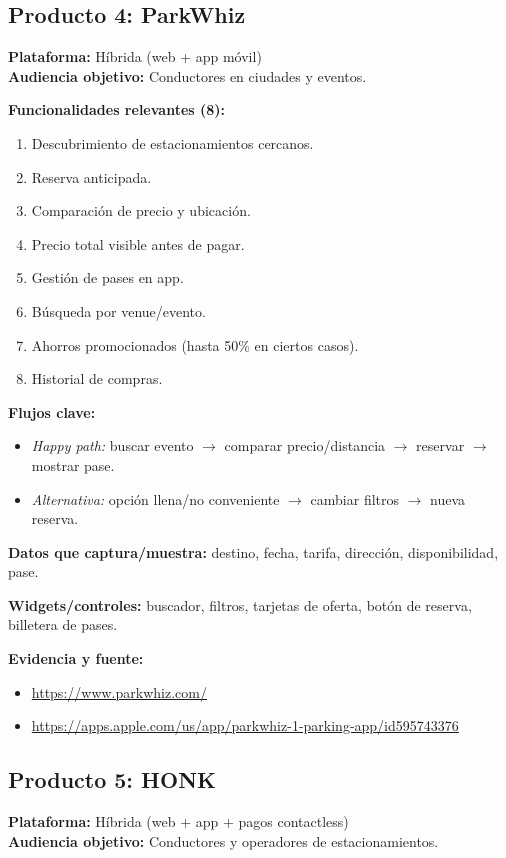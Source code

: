 \documentclass[11pt]{article}
\begin{document}
\subsection{Producto 4: ParkWhiz}
\textbf{Plataforma:} Híbrida (web + app móvil)\\
\textbf{Audiencia objetivo:} Conductores en ciudades y eventos.

\textbf{Funcionalidades relevantes (8):}
\begin{enumerate}
\item Descubrimiento de estacionamientos cercanos.
\item Reserva anticipada.
\item Comparación de precio y ubicación.
\item Precio total visible antes de pagar.
\item Gestión de pases en app.
\item Búsqueda por venue/evento.
\item Ahorros promocionados (hasta 50\% en ciertos casos).
\item Historial de compras.
\end{enumerate}

\textbf{Flujos clave:}
\begin{itemize}
\item \textit{Happy path:} buscar evento $\rightarrow$ comparar precio/distancia $\rightarrow$ reservar $\rightarrow$ mostrar pase.
\item \textit{Alternativa:} opción llena/no conveniente $\rightarrow$ cambiar filtros $\rightarrow$ nueva reserva.
\end{itemize}

\textbf{Datos que captura/muestra:} destino, fecha, tarifa, dirección, disponibilidad, pase.

\textbf{Widgets/controles:} buscador, filtros, tarjetas de oferta, botón de reserva, billetera de pases.

\textbf{Evidencia y fuente:}
\begin{itemize}
\item \url{https://www.parkwhiz.com/}
\item \url{https://apps.apple.com/us/app/parkwhiz-1-parking-app/id595743376}
\end{itemize}

\subsection{Producto 5: HONK}
\textbf{Plataforma:} Híbrida (web + app + pagos contactless)\\
\textbf{Audiencia objetivo:} Conductores y operadores de estacionamientos.
\end{document}

